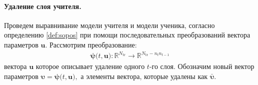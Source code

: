 \paragraph{Удаление слоя учителя.}
Проведем выравнивание модели учителя и модели ученика, согласно определению \ref{def:sopos} при помощи последовательных преобразований вектора параметров $\mathbf{u}$. Рассмотрим преобразование:
\[
\label{ch:3:eq:ap:4}
\begin{aligned}
\bm{\psi}\bigr(t, \mathbf{u}\bigr) : \mathbb{R}^{N_{\text{tr}}} \to \mathbb{R}^{N_{\text{tr}}-n_tn_{t-1}}
\end{aligned}
\]
вектора $\mathbf{u}$ которое описывает удаление одного $t$-го слоя.
Обозначим новый вектор параметров $\bm{\upsilon} = \bm{\psi}\bigr(t, \mathbf{u}\bigr),$ а элементы вектора, которые удалены как $\bar{\bm{\upsilon}}.$ 

